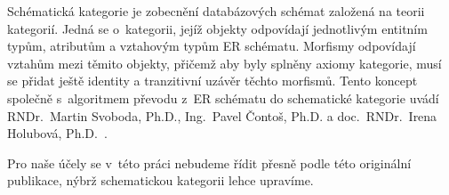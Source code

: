 Schématická kategorie je zobecnění databázových schémat založená na teorii kategorií.
Jedná se o~kategorii, jejíž objekty odpovídají jednotlivým entitním typům, atributům a vztahovým typům ER schématu.
Morfismy odpovídají vztahům mezi těmito objekty, přičemž aby byly splněny axiomy kategorie, musí se přidat ještě identity a tranzitivní uzávěr těchto morfismů.
Tento koncept společně s~algoritmem převodu z~ER schématu do schematické kategorie uvádí
RNDr.~Martin Svoboda, Ph.D.,
Ing.~Pavel Čontoš, Ph.D.
a
doc.~RNDr.~Irena Holubová, Ph.D.~\cite{svoboda_categorical_2021}.

Pro naše účely se v~této práci nebudeme řídit přesně podle této originální publikace, nýbrž schematickou kategorii lehce upravíme.

